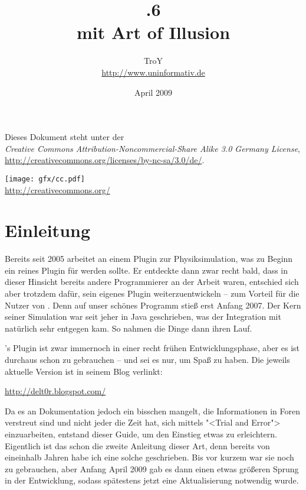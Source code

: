 \documentclass[10pt,DIV=14,a4paper]{scrartcl}
\begin{document}
\author{TroY \\ \url{http://www.uninformativ.de}}
\title{.6 \\ mit Art of Illusion}
\date{April 2009}
\maketitle
\thispagestyle{empty}

\vspace{100mm}

\begin{center}
	Dieses Dokument steht unter der \\
	\textit{Creative Commons Attribution-Noncommercial-Share Alike 3.0 Germany License}, \\
	\url{http://creativecommons.org/licenses/by-nc-sa/3.0/de/}.

	\texttt{[image: gfx/cc.pdf]} \\
	\url{http://creativecommons.org/}
\end{center}

\pagebreak

\tableofcontents
\thispagestyle{empty}
\pagebreak


\section{Einleitung}

Bereits seit 2005 arbeitet \deltor an einem Plugin zur Physiksimulation,
was zu Beginn ein reines Plugin für \blender werden sollte. Er entdeckte
dann zwar recht bald, dass in dieser Hinsicht bereits andere
Programmierer an der Arbeit waren, entschied sich aber trotzdem dafür,
sein eigenes Plugin weiterzuentwickeln -- zum Vorteil für die Nutzer von
\aoi. Denn auf unser schönes Programm stieß \deltor erst Anfang 2007.
Der Kern seiner Simulation war seit jeher in Java geschrieben, was der
Integration mit \aoi natürlich sehr entgegen kam. So nahmen die Dinge
dann ihren Lauf.

\deltor's Plugin ist zwar immernoch in einer recht frühen
Entwicklungsphase, aber es ist durchaus schon zu gebrauchen -- und sei
es nur, um Spaß zu haben. Die jeweils aktuelle Version ist in seinem
Blog verlinkt:

\url{http://delt0r.blogspot.com/}

Da es an Dokumentation jedoch ein bisschen mangelt, die Informationen in
Foren verstreut sind und nicht jeder die Zeit hat, sich mittels "<Trial
and Error"> einzuarbeiten, entstand dieser Guide, um den Einstieg etwas
zu erleichtern. Eigentlich ist das schon die zweite Anleitung dieser
Art, denn bereits von eineinhalb Jahren habe ich eine solche
geschrieben. Bis vor kurzem war sie noch zu gebrauchen, aber Anfang
April 2009 gab es dann einen etwas größeren Sprung in der Entwicklung,
sodass spätestens jetzt eine Aktualisierung notwendig wurde.
\end{document}
